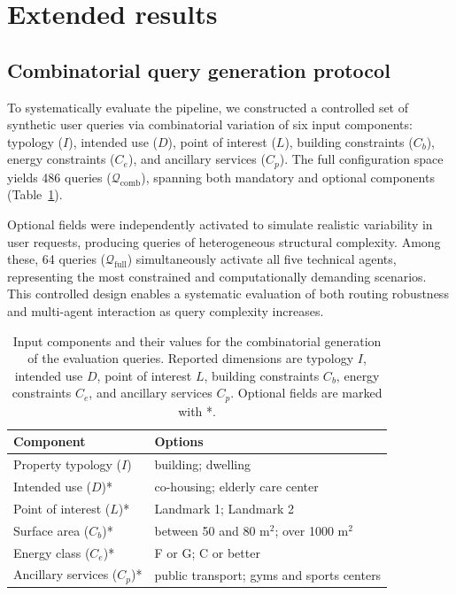 \documentclass[runningheads,orivec]{llncs}
\begin{document}
\section{Extended results}
\subsection{Combinatorial query generation protocol}

To systematically evaluate the pipeline, we constructed a controlled set of synthetic user queries via combinatorial variation of six input components: typology (\(I\)), intended use (\(D\)), point of interest (\(L\)), building constraints (\(C_b\)), energy constraints (\(C_e\)), and ancillary services (\(C_p\)). The full configuration space yields 486 queries (\(\mathcal{Q}_{\mathrm{comb}}\)), spanning both mandatory and optional components (Table~\ref{tab:query-components}).

Optional fields were independently activated to simulate realistic variability in user requests, producing queries of heterogeneous structural complexity. Among these, 64 queries (\(\mathcal{Q}_{\mathrm{full}}\)) simultaneously activate all five technical agents, representing the most constrained and computationally demanding scenarios. This controlled design enables a systematic evaluation of both routing robustness and multi-agent interaction as query complexity increases.


\begin{table}[H]
\caption{Input components and their values for the combinatorial generation of the evaluation queries. Reported dimensions are typology $I$, intended use $D$, point of interest $L$, building constraints $C_b$, energy constraints $C_e$, and ancillary services $C_p$. Optional fields are marked with *.}
\label{tab:query-components}
\centering
\begin{tabular}{ll}
\toprule
\textbf{Component} & \textbf{Options} \\ \midrule
Property typology ($I$) & building; dwelling \\ 
Intended use ($D$)* & co-housing; elderly care center \\ 
Point of interest ($L$)* & Landmark 1; Landmark 2 \\ 
Surface area ($C_b$)* & between 50 and 80 m\(^2\); over 1000 m\(^2\) \\ 
Energy class ($C_e$)* & F or G; C or better \\ 
Ancillary services ($C_p$)* & public transport; gyms and sports centers \\ \bottomrule
\end{tabular}
\end{table}
\end{document}
